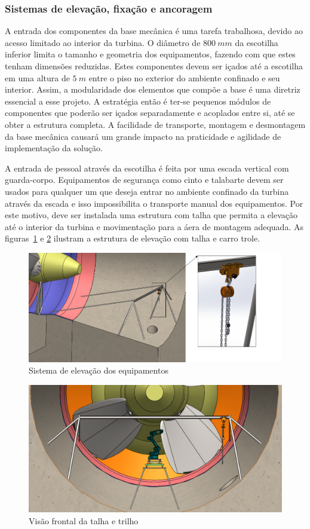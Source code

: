 \subsubsection{Sistemas de elevação, fixação e ancoragem}
A entrada dos componentes da base mecânica é uma tarefa trabalhosa, devido ao
acesso limitado ao interior da turbina. O diâmetro de $800~mm$ da escotilha
inferior limita o tamanho e geometria dos equipamentos, fazendo com que estes
tenham dimensões reduzidas.
Estes componentes devem ser içados até a escotilha em uma altura de $5~m$ entre
o piso no exterior do ambiente confinado e seu interior. Assim, a modularidade dos elementos que compõe a base
é uma diretriz essencial a esse projeto. A estratégia então é ter-se pequenos módulos de componentes
que poderão ser içados separadamente e acoplados entre si, até se obter a
estrutura completa. 
A facilidade de transporte, montagem e desmontagem da base mecânica causará um
grande impacto na praticidade e agilidade de implementação da solução.

A entrada de pessoal através da escotilha é feita por uma escada vertical com
guarda-corpo. Equipamentos de segurança como
cinto e talabarte devem ser usados para qualquer um que deseja entrar no
ambiente confinado da turbina através da escada e isso impossibilita o
transporte manual dos equipamentos. Por este motivo, deve ser instalada uma
estrutura com talha que permita a elevação até o interior da turbina e
movimentação para a áera de montagem adequada. As figuras~\ref{fig::talha} e
\ref{fig::talha_trilho} ilustram a estrutura de elevação com talha e carro
trole. 
  
\begin{figure}[h!]
   \centering
   \includegraphics[width=0.8\columnwidth]{figs/bases/talha}
   \caption{Sistema de elevação dos equipamentos}
   \label{fig::talha}
\end{figure}

\begin{figure}[h!]
   \centering
   \includegraphics[width=0.8\columnwidth]{figs/bases/talha_trilho}
   \caption{Visão frontal da talha e trilho}
   \label{fig::talha_trilho}
\end{figure}

